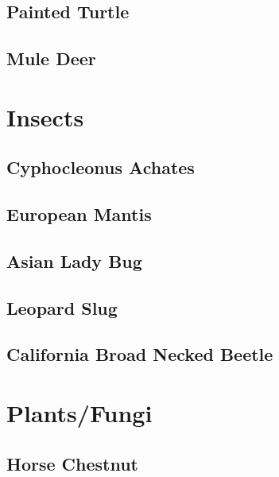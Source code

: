 \documentclass[
]{book}
\begin{document}
\hypertarget{painted-turtle}{%
\section{Painted Turtle}\label{painted-turtle}}

\hypertarget{mule-deer}{%
\section{Mule Deer}\label{mule-deer}}

\hypertarget{insects}{%
\chapter{Insects}\label{insects}}

\hypertarget{cyphocleonus-achates}{%
\section{Cyphocleonus Achates}\label{cyphocleonus-achates}}

\hypertarget{european-mantis}{%
\section{European Mantis}\label{european-mantis}}

\hypertarget{asian-lady-bug}{%
\section{Asian Lady Bug}\label{asian-lady-bug}}

\hypertarget{leopard-slug}{%
\section{Leopard Slug}\label{leopard-slug}}

\hypertarget{california-broad-necked-beetle}{%
\section{California Broad Necked Beetle}\label{california-broad-necked-beetle}}

\hypertarget{plantsfungi}{%
\chapter{Plants/Fungi}\label{plantsfungi}}

\hypertarget{horse-chestnut}{%
\section{Horse Chestnut}\label{horse-chestnut}}
\end{document}
